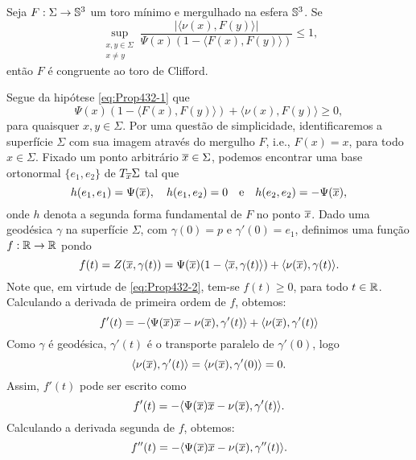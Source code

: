 \begin{proposicao} \label{prop:torus1}
Seja $F:\Sigma\to\mathbb{S}^3$ um toro m\'inimo e mergulhado na esfera
$\mathbb{S}^3$. Se 
\begin{equation} \label{eq:Prop432-1}
\sup_{\substack{x,y \in \Sigma\\ x \neq y}} \frac{| \langle  \nu(x), F(y) \rangle |}
{\Psi(x) (1 - \langle F(x), F(y) \rangle)} \leq 1,
\end{equation}
ent\~ao $F$ \'e congruente ao toro de Clifford.
\end{proposicao}
\begin{demonstracao}
Segue da hip\'otese \eqref{eq:Prop432-1} que
\begin{equation} \label{eq:Prop432-2}
\Psi(x) (1 - \langle F(x), F(y) \rangle) + \langle \nu(x), F(y) \rangle \geq 0,
\end{equation}
para quaisquer $x,y\in\Sigma $. Por uma quest\~ao de simplicidade,
identificaremos a superf\'icie $\Sigma$ com sua imagem atrav\'es 
do mergulho $F$, i.e., $F(x) = x$, para todo $x \in \Sigma$. 
Fixado um ponto arbitr\'ario $\overline{x}\in\Sigma$, podemos encontrar uma
base ortonormal $\{e_1,e_2 \}$ de $T_{\overline{x}}\Sigma$ tal que
\begin{equation*}
h(e_1,e_1) = \Psi(\overline{x}), \quad h(e_1,e_2)=0 \quad \text{e} \quad 
h(e_2,e_2) = -\Psi(\overline{x}),
\end{equation*}
onde $h$ denota a segunda forma fundamental de $F$ no ponto $\overline{x}$.
Dado uma geod\'esica $\gamma$ na superf\'icie $\Sigma$, com 
$\gamma(0)=p$ e $\gamma'(0)=e_1$, definimos uma função $f:\mathbb{R}\to\mathbb{R}$
pondo
\begin{equation*}
f(t) = Z(\overline{x},\gamma(t)) = 
\Psi(\overline{x}) (1 - \langle \overline{x}, \gamma(t) \rangle) + \langle \nu(\overline{x}), 
\gamma(t) \rangle.
\end{equation*}
Note que, em virtude de \eqref{eq:Prop432-2}, tem-se $f(t)\geq0$,
para todo $t\in\mathbb{R}$.
Calculando a derivada de primeira ordem de $f$, obtemos:
\[
f'(t) = -\langle \Psi(\overline{x}) \overline{x} - \nu(\overline{x}), \gamma'(t) \rangle + 
\langle \nu(\overline{x}), \gamma'(t) \rangle
\]
Como $\gamma$ \'e geodésica, $\gamma'(t)$ \'e o transporte paralelo
de $\gamma'(0)$, logo
\[
\langle\nu(\overline{x}),\gamma'(t)\rangle = \langle\nu(\overline{x}),
\gamma'(0)\rangle = 0.
\]
Assim, $f'(t)$ pode ser escrito como
\begin{equation*}
f'(t) = -\langle \Psi(\overline{x}) \overline{x} - \nu(\overline{x}), \gamma'(t) \rangle.
\end{equation*}
Calculando a derivada segunda de $f$, obtemos:
\begin{equation*}
f''(t) = -\langle \Psi(\xb) \xb - \nu(\xb), \gamma''(t) \rangle.

\end{equation*}
\end{demonstracao}

